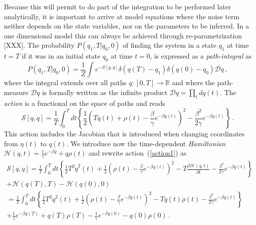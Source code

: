 \documentclass[11pt]{article}
\theoremstyle{definition}
\begin{document}
Because this will permit to do part of the integration to be performed later analytically, it is important to arrive at model equations where the noise term neither depends on the state variables, nor on the parameters to be inferred. In a one dimensional model this can always be achieved through re-parametrization [XXX]. The probability $P(q_1,T|q_0,0)$ of finding the system in a state $q_1$ at time $t = T$ if it was in an initial state $q_0$ at time $t = 0$, is expressed as a {\em path-integral} as
\begin{equation}\label{pathint}
P(q_1,T|q_0,0)
=
\frac{1}{Z}
\int
e^{-{\mathcal S}[q,\dot q]}
\delta(q(T)-q_1)
\delta(q(0)-q_0)
\mathcal{D}q \,,
\end{equation}
where the integral extends over all paths $q:[0,T]\rightarrow \mathbb R$ and where the path-measure $\mathcal Dq$ is formally written as the infinite product
${\mathcal Dq}=\prod_{t}dq(t)$.
The {\em action} is a functional on the space of paths and reads  \cite{lau_2007}
\begin{equation}\label{action1}
{\mathcal S}[{q},\dot q]
=
\frac{1}{T}
\int_0^T dt \left\{
\frac{1}{2}
\left(
    T\dot q(t)
    +
    \rho(t)
    -
    \frac{\beta}{\gamma}e^{-\beta q(t)}\right)^2
    -
    \frac{\beta^2}{2\gamma}e^{-\beta q(t)}
\right\} \,.
\end{equation}
This action includes the Jacobian that is introduced when changing coordinates from
 ${\eta(t)}$ to $q(t)$.
We introduce now the time-dependent {\em Hamiltonian}
$  \mathcal{H}(q,t)= \frac{1}{\gamma}e^{-\beta q}+q\rho(t)$
and rewrite action~(\ref{action1}) as
\begin{multline}\label{action}
{\mathcal S}[{q},\dot q]
= \frac{1}{T}
\int_0^T dt\left\{
    \frac{1}{2}
    T^2\dot q^2(t) +
    \frac{1}{2}
    \left(\rho(t)-\frac{\beta}{\gamma}e^{-\beta q(t)}\right)^2 -
    T\frac{\partial \mathcal{H}(q,t)}{\partial t} -
    \frac{\beta^2}{2\gamma}e^{-\beta q(t)}
\right\}
\\
+ \mathcal{H}(q(T),T) - \mathcal{H}(q(0),0)
\\
= \frac{1}{T}
\int_0^T dt\left\{
    \frac{1}{2}
    T^2\dot q^2(t) +
    \frac{1}{2}
    \left(\rho(t)-\frac{\beta}{\gamma}e^{-\beta q(t)}\right)^2 -
    Tq(t)\dot\rho(t) -
     \frac{\beta^2}{2\gamma}e^{-\beta q(t)}
\right\}
\\
+
    \frac{1}{\gamma}e^{-\beta q(T)}+q(T)\rho(T)
   -\frac{1}{\gamma}e^{-\beta q(0)}-q(0)\rho(0)
\,.
\end{multline}
\end{document}
